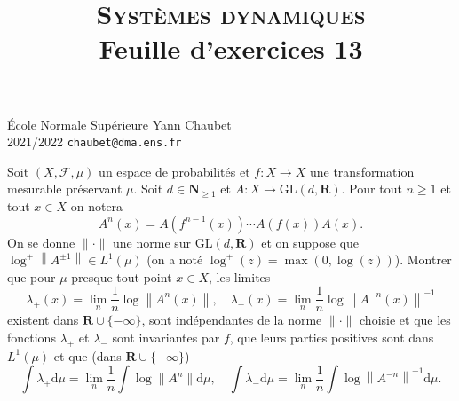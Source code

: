 \documentclass[a4paper,10pt,openany]{article}
\title{\textsc{Syst\`emes dynamiques} \\ Feuille d'exercices 13}
\date{}
\author{}
\theoremstyle{plain}
\theoremstyle{definition}
\newcommand{\dd}{\mathrm{d}}
\newcommand{\R}{\mathbf{R}}
\newcommand{\N}{\mathbf{N}}
\begin{document}
{\noindent \'Ecole Normale Sup\'erieure  \hfill Yann Chaubet } \\
{2021/2022 \hfill \texttt{chaubet@dma.ens.fr}}

{\let\newpage\relax\maketitle}
\maketitle


 \vspace{1.5mm} 

\noindent Soit $(X, \mathscr{F}, \mu)$ un espace de probabilit\'es et $f : X \to X$ une transformation mesurable pr\'eservant $\mu$. Soit $d \in \N_{\geq 1}$ et $A : X \to \mathrm{GL}(d, \R)$. Pour tout $n \geq 1$ et tout $x \in X$ on notera
$$
A^n(x) = A(f^{n-1}(x)) \cdots A(f(x)) A(x).
$$
On se donne $\| \cdot \|$ une norme sur $\mathrm{GL}(d,\R)$ et on suppose que $\log^+ \left\|A^{\pm 1}\right\| \in L^1(\mu)$ (on a not\'e $\log^+(z) = \max(0, \log(z))$). Montrer que pour $\mu$ presque tout point $x \in X$, les limites
$$
\lambda_{+}(x) = \lim_n \frac{1}{n}\log \left \|A^{n}(x)\right\|, \quad \lambda_{-}(x) = \lim_n \frac{1}{n}\log \left \|A^{-n}(x)\right\|^{-1}
$$
existent dans $\R \cup \{-\infty\}$, sont ind\'ependantes de la norme $\| \cdot \|$ choisie et que les fonctions $\lambda_+$ et $\lambda_-$ sont invariantes par $f$, que leurs parties positives sont dans $L^1(\mu)$ et que (dans $\R \cup \{-\infty\}$)
$$
\int \lambda_+ \dd \mu = \lim_n \frac{1}{n} \int \log \|A^n\| \dd \mu, \quad \int \lambda_- \dd \mu = \lim_n \frac{1}{n} \int \log \left\|A^{-n}\right\|^{-1} \dd \mu.
$$
\vspace{0.6cm}



 \vspace{1.5mm}
\end{document}
